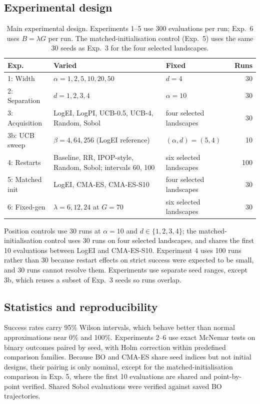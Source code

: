 \documentclass[11pt,a4paper]{article}
\begin{document}
\subsection{Experimental design}
\begin{table}[!htbp]
\centering\small
\begin{tabular}{@{}p{2.3cm}p{6.4cm}p{3.6cm}r@{}}
\toprule
Exp. & Varied & Fixed & Runs\\
\midrule
1: Width & $\alpha=1,2,5,10,20,50$ & $d=4$ & 30\\
2: Separation & $d=1,2,3,4$ & $\alpha=10$ & 30\\
3: Acquisition & LogEI, LogPI, UCB-0.5, UCB-4, Random, Sobol & four selected landscapes & 30\\
3b: UCB sweep & $\beta=4,64,256$ (LogEI reference) & $(\alpha,d)=(5,4)$ & 10\\
4: Restarts & Baseline, RR, IPOP-style, Random, Sobol; intervals 60, 100 & six selected landscapes & 100\\
5: Matched init & LogEI, CMA-ES, CMA-ES-S10 & four selected landscapes & 30\\
6: Fixed-gen & $\lambda=6,12,24$ at $G=70$ & six selected landscapes & 30\\
\bottomrule
\end{tabular}
\caption{Main experimental design. Experiments 1--5 use 300 evaluations per run; Exp.\ 6 uses $B=\lambda G$ per run. The matched-initialisation control (Exp.\ 5) uses the same 30 seeds as Exp.\ 3 for the four selected landscapes.}
\end{table}
Position controls use 30 runs at $\alpha=10$ and $d\in\{1,2,3,4\}$; the matched-initialisation control uses 30 runs on four selected landscapes, and shares the first 10 evaluations between LogEI and CMA-ES-S10. Experiment 4 uses 100 runs rather than 30 because restart effects on strict success were expected to be small, and 30 runs cannot resolve them. Experiments use separate seed ranges, except 3b, which reuses a subset of Exp.\ 3 seeds so runs overlap.

\subsection{Statistics and reproducibility}
Success rates carry 95\% Wilson intervals, which behave better than normal approximations near 0\% and 100\%. Experiments 2--6 use exact McNemar tests on binary outcomes paired by seed, with Holm correction within predefined comparison families. Because BO and CMA-ES share seed indices but not initial designs, their pairing is only nominal, except for the matched-initialisation comparison in Exp. 5, where the first 10 evaluations are shared and point-by-point verified. Shared Sobol evaluations were verified against saved BO trajectories.
\end{document}
